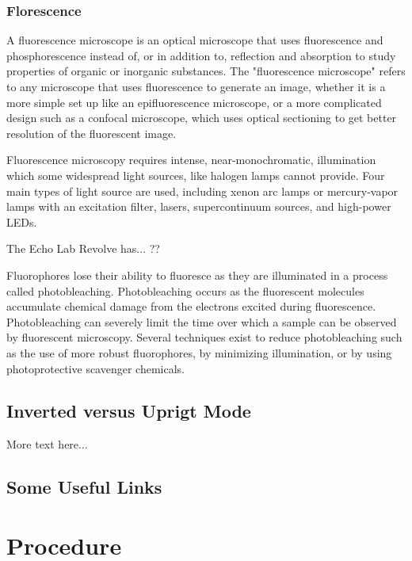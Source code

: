 \documentclass{article}
\begin{document}
\subsubsection{Florescence}

A fluorescence microscope is an optical microscope that uses fluorescence and phosphorescence instead of, or in addition to, reflection and absorption to study properties of organic or inorganic substances. The "fluorescence microscope" refers to any microscope that uses fluorescence to generate an image, whether it is a more simple set up like an epifluorescence microscope, or a more complicated design such as a confocal microscope, which uses optical sectioning to get better resolution of the fluorescent image.

Fluorescence microscopy requires intense, near-monochromatic, illumination which some widespread light sources, like halogen lamps cannot provide. Four main types of light source are used, including xenon arc lamps or mercury-vapor lamps with an excitation filter, lasers, supercontinuum sources, and high-power LEDs. 

The Echo Lab Revolve has... ??

Fluorophores lose their ability to fluoresce as they are illuminated in a process called photobleaching. Photobleaching occurs as the fluorescent molecules accumulate chemical damage from the electrons excited during fluorescence. Photobleaching can severely limit the time over which a sample can be observed by fluorescent microscopy. Several techniques exist to reduce photobleaching such as the use of more robust fluorophores, by minimizing illumination, or by using photoprotective scavenger chemicals.

\subsection{Inverted versus Uprigt Mode}

More text here...

\subsection{Some Useful Links}


\section{Procedure}
\end{document}
